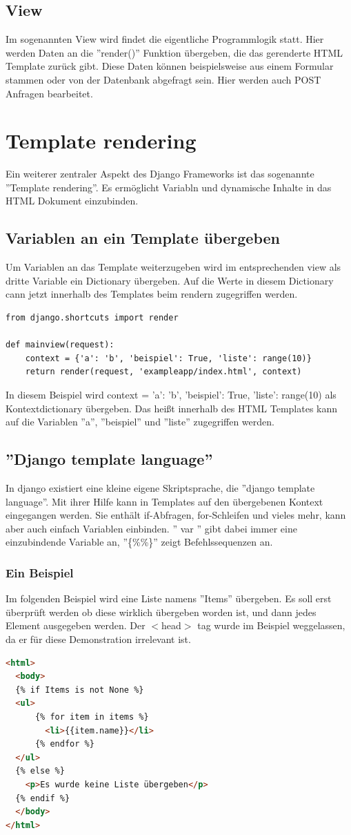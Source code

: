 \documentclass{article}
\begin{document}
\subsection{View}
Im sogenannten View wird findet die eigentliche Programmlogik statt. Hier werden Daten an die ''render()'' Funktion übergeben, die das gerenderte HTML Template zurück gibt. Diese Daten können beispielsweise aus einem Formular stammen oder von der Datenbank abgefragt sein. Hier werden auch POST Anfragen bearbeitet.
\section{Template rendering}
Ein weiterer zentraler Aspekt des Django Frameworks ist das sogenannte ''Template rendering''. Es ermöglicht Variabln und dynamische Inhalte in das HTML Dokument einzubinden. 
\subsection{Variablen an ein Template übergeben}
Um Variablen an das Template weiterzugeben wird im entsprechenden view als dritte Variable ein Dictionary übergeben. Auf die Werte in diesem Dictionary cann jetzt innerhalb des Templates beim rendern zugegriffen werden.
\begin{verbatim}
from django.shortcuts import render

def mainview(request):
	context = {'a': 'b', 'beispiel': True, 'liste': range(10)}
	return render(request, 'exampleapp/index.html', context)
\end{verbatim}
In diesem Beispiel wird context = {'a': 'b', 'beispiel': True, 'liste': range(10)} als Kontextdictionary übergeben. Das heißt innerhalb des HTML Templates kann auf die Variablen ''a'', ''beispiel'' und ''liste'' zugegriffen werden.
\subsection{''Django template language''}
In django existiert eine kleine eigene Skriptsprache, die ''django template language''. Mit ihrer Hilfe kann in Templates auf den übergebenen Kontext eingegangen werden. Sie enthält if-Abfragen, for-Schleifen und vieles mehr, kann aber auch einfach Variablen einbinden. ''{{ var }}'' gibt dabei immer eine einzubindende Variable an, ''\{\%\%\}'' zeigt Befehlssequenzen an. 
\subsubsection{Ein Beispiel}
Im folgenden Beispiel wird eine Liste namens ''Items'' übergeben. Es soll erst überprüft werden ob diese wirklich übergeben worden ist, und dann jedes Element ausgegeben werden. Der $<$head$>$ tag wurde im Beispiel weggelassen, da er für diese Demonstration irrelevant ist.
\begin{lstlisting}[language=html]
<html>
  <body>
  {% if Items is not None %}
  <ul>
      {% for item in items %}
      	<li>{{item.name}}</li>
      {% endfor %}
  </ul>
  {% else %}
  	<p>Es wurde keine Liste übergeben</p>
  {% endif %}
  </body>
</html>
\end{lstlisting}
\end{document}
